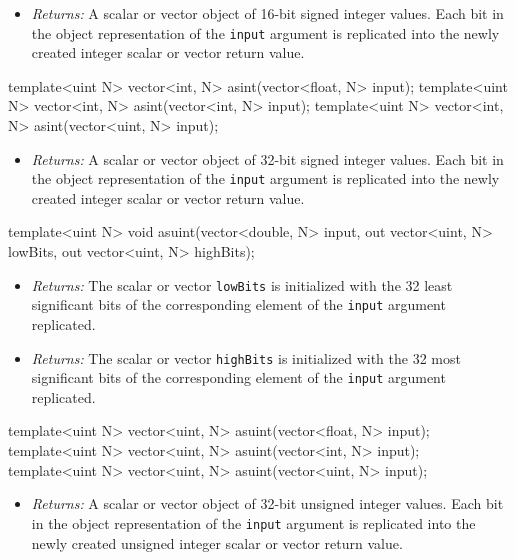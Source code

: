 \begin{itemize}
  \item \textit{Returns:} A scalar or vector object of 16-bit signed integer
  values. Each bit in the object representation of the \texttt{input} argument
  is replicated into the newly created integer scalar or vector return value.
\end{itemize}

\begin{HLSL}
template<uint N> vector<int, N> asint(vector<float, N> input);
template<uint N> vector<int, N> asint(vector<int, N> input);
template<uint N> vector<int, N> asint(vector<uint, N> input);
\end{HLSL}

\begin{itemize}
  \item \textit{Returns:} A scalar or vector object of 32-bit signed integer
  values. Each bit in the object representation of the \texttt{input} argument
  is replicated into the newly created integer scalar or vector return value.
\end{itemize}

\begin{HLSL}
template<uint N> void asuint(vector<double, N> input, out vector<uint, N> lowBits, out vector<uint, N> highBits);
\end{HLSL}

\begin{itemize}
  \item \textit{Returns:} The scalar or vector \texttt{lowBits} is initialized
  with the 32 least significant bits of the corresponding element of the
  \texttt{input} argument replicated.
  \item \textit{Returns:} The scalar or vector \texttt{highBits} is initialized
  with the 32 most significant bits of the corresponding element of the
  \texttt{input} argument replicated.
\end{itemize}

\begin{HLSL}
template<uint N> vector<uint, N> asuint(vector<float, N> input);
template<uint N> vector<uint, N> asuint(vector<int, N> input);
template<uint N> vector<uint, N> asuint(vector<uint, N> input);
\end{HLSL}

\begin{itemize}
  \item \textit{Returns:} A scalar or vector object of 32-bit unsigned integer
  values. Each bit in the object representation of the \texttt{input} argument
  is replicated into the newly created unsigned integer scalar or vector return
  value.
\end{itemize}

